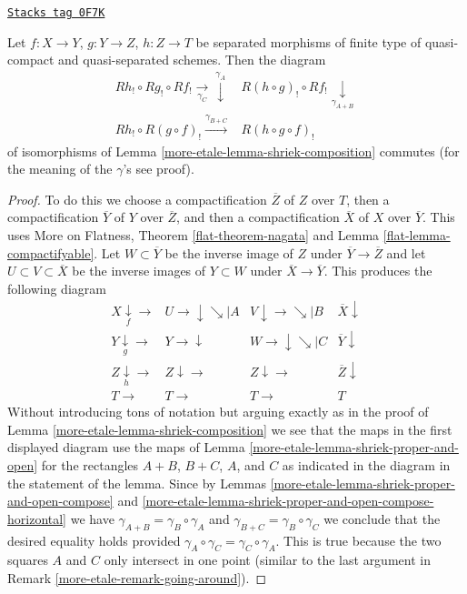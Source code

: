 \begin{lemma}
\label{more-etale-lemma-pseudo-functor}
\href{https://stacks.math.columbia.edu/tag/0F7K}{\texttt{Stacks tag 0F7K}}

Let $f : X \to Y$, $g : Y \to Z$, $h : Z \to T$ be separated morphisms of
finite type of quasi-compact and quasi-separated schemes. Then
the diagram
$$
\begin{array}{cc}Rh_! \circ Rg_! \circ Rf_! \underset{\gamma_C}{\longrightarrow}\overset{\gamma_A}{\downarrow} & R(h \circ g)_! \circ Rf_! \underset{\gamma_{A + B}}{\downarrow} \\ Rh_! \circ R(g \circ f)_! \overset{\gamma_{B + C}}{\longrightarrow} & R(h \circ g \circ f)_!\end{array}
$$
of isomorphisms of Lemma \ref{more-etale-lemma-shriek-composition} commutes
(for the meaning of the $\gamma$'s see proof).
\end{lemma}

\begin{proof}
To do this we choose a compactification $\overline{Z}$
of $Z$ over $T$, then a compactification $\overline{Y}$ of $Y$ over
$\overline{Z}$, and then a compactification $\overline{X}$ of
$X$ over $\overline{Y}$. This uses
More on Flatness, Theorem \ref{flat-theorem-nagata} and
Lemma \ref{flat-lemma-compactifyable}.
Let $W \subset \overline{Y}$ be the inverse image of $Z$ under
$\overline{Y} \to \overline{Z}$ and let $U \subset V \subset \overline{X}$
be the inverse images of $Y \subset W$ under $\overline{X} \to \overline{Y}$.
This produces the following diagram
$$
\begin{array}{cccc}X \underset{f}{\downarrow}\longrightarrow & U \longrightarrow\downarrow\searrow|A & V \downarrow\longrightarrow\searrow|B & \overline{X} \downarrow \\ Y \underset{g}{\downarrow}\longrightarrow & Y \longrightarrow\downarrow & W \longrightarrow\downarrow\searrow|C & \overline{Y} \downarrow \\ Z \underset{h}{\downarrow}\longrightarrow & Z \downarrow\longrightarrow & Z \downarrow\longrightarrow & \overline{Z} \downarrow \\ T \longrightarrow & T \longrightarrow & T \longrightarrow & T\end{array}
$$
Without introducing tons of notation but arguing exactly
as in the proof of Lemma \ref{more-etale-lemma-shriek-composition}
we see that the maps in the first displayed diagram use the
maps of Lemma \ref{more-etale-lemma-shriek-proper-and-open} for the rectangles
$A + B$, $B + C$, $A$, and $C$ as indicated in the diagram in
the statement of the lemma. Since by
Lemmas \ref{more-etale-lemma-shriek-proper-and-open-compose} and
\ref{more-etale-lemma-shriek-proper-and-open-compose-horizontal}
we have $\gamma_{A + B} = \gamma_B \circ \gamma_A$ and
$\gamma_{B + C} = \gamma_B \circ \gamma_C$ we conclude
that the desired equality holds provided
$\gamma_A \circ \gamma_C = \gamma_C \circ \gamma_A$.
This is true because the two squares $A$ and $C$ only
intersect in one point (similar to the last argument in
Remark \ref{more-etale-remark-going-around}).
\end{proof}

